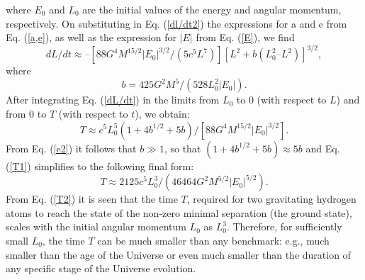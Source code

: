 \documentclass[referee]{raa}            %
\begin{document}
where $E_0$ and $L_0$ are the initial values of the energy and angular momentum, respectively.
On substituting in Eq. (\ref{dl/dt2}) the expressions for a and e from Eq. (\ref{a,e}), as well as the expression for $|E|$ from Eq. (\ref{E}), we find
	\begin{equation}
		dL/dt \approx – [88G^4M^{15/2}|E_0|^{3/2}/(5c^5L^7)][L^2 + b(L_0^2 – L^2)]^{3/2},
		\label{dL/dt}
	\end{equation}
where
	\begin{equation*}
		b = 425G^2M^5/(528L_0^2|E_0|).	
	\end{equation*}
After integrating Eq. (\ref{dL/dt}) in the limits from $L_0$ to $0$ (with respect to $L$) and from $0$ to $T$ (with respect to $t$), we obtain:
	\begin{equation}
		T \approx c^5L_0^5(1 + 4b^{1/2} + 5b)/[88G^4M^{15/2}|E_0|^{3/2}].	
		\label{T1}
	\end{equation}
From Eq. (\ref{e2}) it follows that $b \gg 1$, so that $(1 + 4b^{1/2} + 5b) \approx 5b$ and Eq. (\ref{T1}) simplifies to the following final form:
	\begin{equation}
		T \approx 2125c^5L_0^3/(46464G^2M^{5/2}|E_0|^{5/2}).
		\label{T2}
	\end{equation}
From Eq. (\ref{T2}) it is seen that the time $T$, required for two gravitating hydrogen atoms to reach the state of the non-zero minimal separation (the ground state), scales with the initial angular momentum $L_0$ as $L_0^3$. Therefore, for sufficiently small $L_0$, the time $T$ can be much smaller than any benchmark: e.g., much smaller than the age of the Universe or even much smaller than the duration of any specific stage of the Universe evolution.
	
	
	
\end{document}

